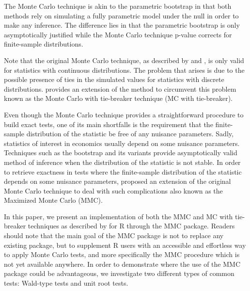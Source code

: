 \documentclass[]{article}\usepackage[]{graphicx}\usepackage[]{color}
\newcommand{\pkg}[1]{{\normalfont\fontseries{b}\selectfont #1}}
\let\proglang=\textsf
\begin{document}
The Monte Carlo technique is akin to the parametric bootstrap in that both methods rely on simulating a fully parametric model under the null in order to make any inference. The difference lies in that the parametric bootstrap is only asymptotically justified while the Monte Carlo technique p-value corrects for finite-sample distributions.

Note that the original Monte Carlo technique, as described by \cite{dwass_modified_1957} and \cite{barnard_comment_1963}, is only valid for statistics with continuous distributions. The problem that arises is due to the possible presence of ties in the simulated values for statistics with discrete distributions. \cite{dufour_monte_2006} provides an extension of the method to circumvent this problem known as the Monte Carlo with tie-breaker technique (MC with tie-breaker).

Even though the Monte Carlo technique provides a straightforward procedure to build exact tests, one of its main shortfalls is the requirement that the finite-sample distribution of the statistic be free of any nuisance parameters. Sadly, statistics of interest in economics usually depend on some nuisance parameters. Techniques such as the bootstrap and its variants provide asymptotically valid method of inference when the distribution of the statistic is not stable. In order to retrieve exactness in tests where the finite-sample distribution of the statistic depends on some nuisance parameters, \cite{dufour_monte_2006} proposed an extension of the original Monte Carlo technique to deal with such complications also known as the Maximized Monte Carlo (MMC).

In this paper, we present an implementation of both the MMC and MC with tie-breaker techniques as described by \cite{dufour_monte_2006} for \proglang{R} through the \pkg{MMC} package. Readers should note that the main goal of the \pkg{MMC} package is not to replace any existing package, but to supplement \proglang{R} users with an accessible and effortless way to apply Monte Carlo tests, and more specifically the MMC procedure which is not yet available anywhere. In order to demonstrate where the use of the \pkg{MMC} package could be advantageous, we investigate two different types of common tests: Wald-type tests and unit root tests.
\end{document}
